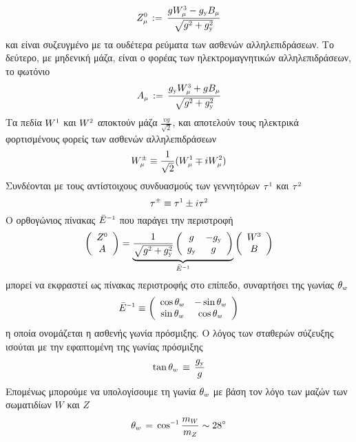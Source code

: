 \begin{equation}\label{Z boson}
    Z\subscr{\mu}\superscr{0}\,:=\,\frac{gW\subscr{\mu}\superscr{3}-g\subscr{\y}B\subscr{\mu}}{\sqrt{g\superscr{2}+g\subscr{\y}\superscr{2}}}
\end{equation}
και είναι συζευγμένο με τα ουδέτερα ρεύματα των ασθενών αλληλεπιδράσεων.
Το δεύτερο, με μηδενική μάζα, είναι ο φορέας των ηλεκτρομαγνητικών αλληλεπιδράσεων, το φωτόνιο
\begin{equation}\label{A boson}
    A\subscr{\mu}\,:=\,\frac{g\subscr{\y}W\superscr{3}\subscr{\mu}+gB\subscr{\mu}}{\sqrt{g\superscr{2}+g\subscr{\y}\superscr{2}}}
\end{equation}
Τα πεδία $W\superscr{1}$ και $W\superscr{2}$ αποκτούν μάζα $\frac{vg}{\sqrt{2}}$, και αποτελούν τους ηλεκτρικά φορτισμένους φορείς των ασθενών αλληλεπιδράσεων
\begin{equation}
    W\superscr{\pm}\subscr{\mu}\equiv \frac{1}{\sqrt{2}}(W\superscr{1}\subscr{\mu}\mp iW\superscr{2}\subscr{\mu})
\end{equation}
Συνδέονται με τους αντίστοιχους συνδυασμούς των γεννητόρων $\tau\superscr{1}$ και $\tau\superscr{2}$
\begin{equation}
    \tau\superscr{\pm}\equiv \tau\superscr{1}\pm i\tau\superscr{2}
\end{equation}
Ο ορθογώνιος πίνακας $\Bar{E}\superscr{-1}$ που παράγει την  περιστροφή
\begin{equation}
\left(\begin{array}{c}Z\superscr{0}\\A\end{array}\right)=\underbrace{\frac{1}{\sqrt{g\superscr{2}+g\subscr{\y}\superscr{2}}}\left(\begin{array}{cc}
    g & -g\subscr{\y} \\
    g\subscr{\y} & g
\end{array}\right)}_{\Bar{E}\superscr{-1}}\left(\begin{array}{c}W\superscr{3}\\B\end{array}\right)
\end{equation}
μπορεί να εκφραστεί ως πίνακας περιστροφής στο επίπεδο, συναρτήσει της γωνίας $\theta\subscr{w}$ 
\begin{equation}
\Bar{E}\superscr{-1}\equiv\left(\begin{array}{cc}
    \cos\theta\subscr{w} & -\sin\theta\subscr{w} \\
    \sin\theta\subscr{w} & \cos\theta\subscr{w}
\end{array}\right)
\end{equation}
η οποία ονομάζεται η ασθενής γωνία πρόσμιξης.
Ο λόγος των σταθερών σύζευξης ισούται με την εφαπτομένη της γωνίας πρόσμιξης 
\begin{equation}
    \tan\theta\subscr{w}\,\equiv\,\frac{g\subscr{\y}}{g}
\end{equation}
Επομένως μπορούμε να υπολογίσουμε τη γωνία $\theta\subscr{w}$ με βάση τον λόγο των μαζών των σωματιδίων $W$ και $Z$ 
\begin{equation}
    \theta\subscr{w}\,=\,\cos\superscr{-1}\frac{m\subscr{W}}{m\subscr{Z}}\sim 28^{\circ}
\end{equation}
\\

